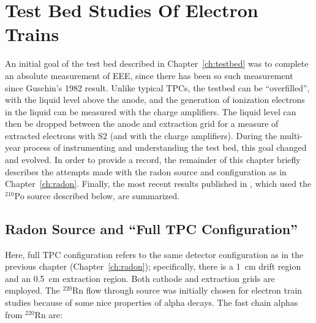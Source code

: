 \section{Test Bed Studies Of Electron Trains}
An initial goal of the test bed described in Chapter~\ref{ch:testbed} was to complete an absolute measurement of \ac{EEE}, since there has been so such measurement since Guschin's 1982 result. Unlike typical \ac{TPC}s, the testbed can be ``overfilled'', with the liquid level above the anode, and the generation of ionization electrons in the liquid can be measured with the charge amplifiers. The liquid level can then be dropped between the anode and extraction grid for a measure of extracted electrons with S2 (and with the charge amplifiers). During the multi-year process of instrumenting and understanding the test bed, this goal changed and evolved. In order to provide a record, the remainder of this chapter briefly describes the attempts made with the radon source and configuration as in Chapter~\ref{ch:radon}. Finally, the most recent results published in \cite{SorensenKamdin2018}, which used the $^{210}$Po source described below, are summarized.

\subsection{Radon Source and ``Full TPC Configuration''}
\label{sec:testbed_measurement_challenges}
Here, full \ac{TPC} configuration refers to the same detector configuration as in the previous chapter (Chapter~\ref{ch:radon}); specifically, there is a 1~cm drift region and an 0.5~cm extraction region. Both cathode and extraction grids are employed. The $^{220}$Rn flow through source was initially chosen for electron train studies because of some nice properties of alpha decays. The fast chain alphas from $^{220}$Rn are:

